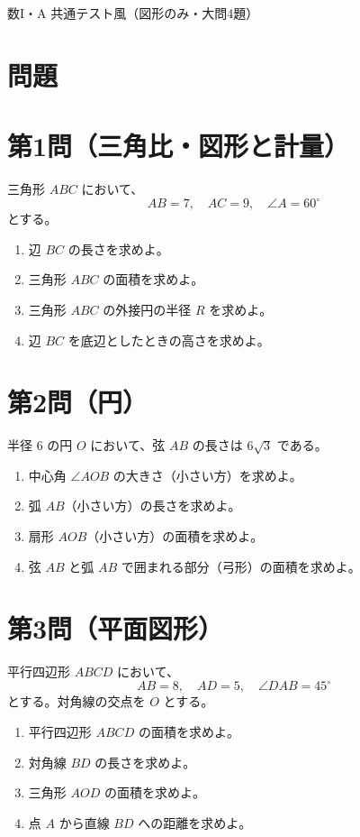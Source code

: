 \documentclass[a4paper,12pt]{ltjsarticle}
\begin{document}
\begin{center}
{\LARGE 数I・A 共通テスト風（図形のみ・大問4題）}
\end{center}

\vspace{1em}

\section*{問題}

\section*{第1問（三角比・図形と計量）}
三角形 \(ABC\) において、
\[
AB=7,\quad AC=9,\quad \angle A=60^\circ
\]
とする。
\begin{enumerate}[label=\arabic*.]
  \item 辺 \(BC\) の長さを求めよ。
  \item 三角形 \(ABC\) の面積を求めよ。
  \item 三角形 \(ABC\) の外接円の半径 \(R\) を求めよ。
  \item 辺 \(BC\) を底辺としたときの高さを求めよ。
\end{enumerate}

\section*{第2問（円）}
半径 \(6\) の円 \(O\) において、弦 \(AB\) の長さは \(6\sqrt{3}\) である。
\begin{enumerate}[label=\arabic*.]
  \item 中心角 \(\angle AOB\) の大きさ（小さい方）を求めよ。
  \item 弧 \(AB\)（小さい方）の長さを求めよ。
  \item 扇形 \(AOB\)（小さい方）の面積を求めよ。
  \item 弦 \(AB\) と弧 \(AB\) で囲まれる部分（弓形）の面積を求めよ。
\end{enumerate}

\section*{第3問（平面図形）}
平行四辺形 \(ABCD\) において、
\[
AB=8,\quad AD=5,\quad \angle DAB=45^\circ
\]
とする。対角線の交点を \(O\) とする。
\begin{enumerate}[label=\arabic*.]
  \item 平行四辺形 \(ABCD\) の面積を求めよ。
  \item 対角線 \(BD\) の長さを求めよ。
  \item 三角形 \(AOD\) の面積を求めよ。
  \item 点 \(A\) から直線 \(BD\) への距離を求めよ。
\end{enumerate}
\end{document}
